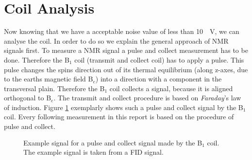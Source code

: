 \section{Coil Analysis}
\label{sec:CoilAnalyssis}
Now knowing that we have a acceptable noise value of less than \SI{10}{\mu \volt}, we can analyse the coil.
In order to do so we explain the general approach of NMR signals first.
To measure a NMR signal a pulse and collect measurement has to be done.
Therefore the B$_1$ coil (transmit and collect coil) has to apply a pulse.
This pulse changes the spins direction out of its thermal equilibrium (along z-axes, due to the earths magnetic field B$_e$) into a direction with a component in the transversal plain.
Therefore the B$_1$ coil collects a signal, because it is aligned orthogonal to B$_e$.
The transmit and collect procedure is based on \textit{Faraday}'s law of induction.
Figure \ref{fig: PulsandcollectValesignal} exemplarly shows such a pulse and collect signal by the B$_1$ coil.
Every following measurement in this report is based on the procedure of pulse and collect.

\begin{figure}[H]
    \centering
    
    \caption[Example signal for a pulse and collect signal made by the B$_1$ coil.]{Example signal for a pulse and collect signal made by the B$_1$ coil.
    The example signal is taken from a FID signal.}
    \label{fig: PulsandcollectValesignal}
\end{figure}

